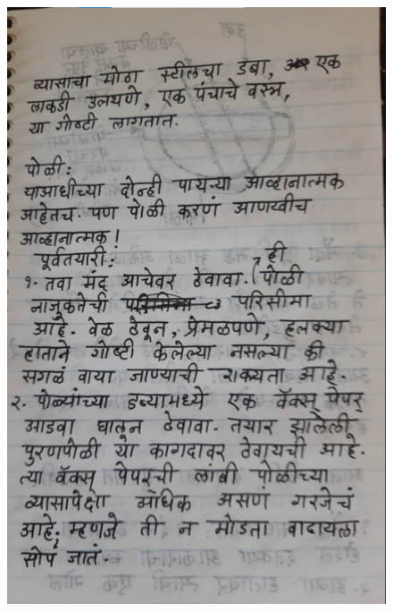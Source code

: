 \documentclass[17pt]{extarticle}  %
\begin{document}
\begin{figure}[h!]
    \centering
    \includegraphics{img/09-s.png}
\end{figure}
\end{document}
